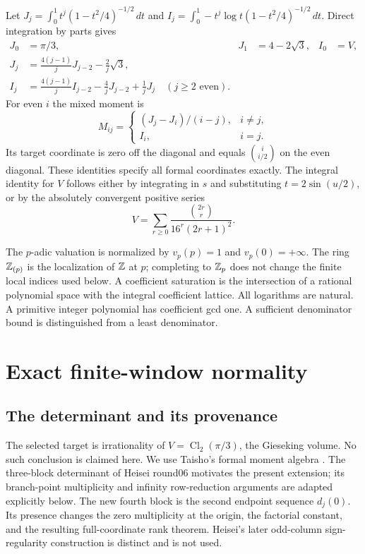 \documentclass[11pt,a4paper]{article}
\numberwithin{equation}{section}
\theoremstyle{definition}\newtheorem{definition}[theorem]{Definition}
\theoremstyle{remark}\newtheorem{remark}[theorem]{Remark}
\begin{document}
Let $J_j=\int_0^1t^j(1-t^2/4)^{-1/2}\,dt$ and
$I_j=\int_0^1-t^j\log t(1-t^2/4)^{-1/2}\,dt$. Direct integration by parts
gives
\begin{align*}
 J_0&=\pi/3,& J_1&=4-2\sqrt3,& I_0&=V,\\
 J_j&=\frac{4(j-1)}jJ_{j-2}-\frac2j\sqrt3,\\
 I_j&=\frac{4(j-1)}jI_{j-2}-\frac4jJ_{j-2}+\frac1jJ_j
 \quad(j\ge2\text{ even}).
\end{align*}
For even $i$ the mixed moment is
\[
 M_{ij}=\begin{cases}(J_j-J_i)/(i-j),&i\ne j,\\I_i,&i=j.
 \end{cases}
\]
Its target coordinate is zero off the diagonal and equals
$\binom{i}{i/2}$ on the even diagonal. These identities specify all formal
coordinates exactly. The integral identity for $V$ follows either by
integrating in $s$ and substituting $t=2\sin(u/2)$, or by the absolutely
convergent positive series
\[
 V=\sum_{r\ge0}\frac{\binom{2r}{r}}{16^r(2r+1)^2}.
\]

The $p$-adic valuation is normalized by $v_p(p)=1$ and $v_p(0)=+\infty$.
The ring $\mathbb Z_{(p)}$ is the localization of $\mathbb Z$ at $p$; completing to
$\mathbb Z_p$ does not change the finite local indices used below. A coefficient
saturation is the intersection of a rational polynomial space with the
integral coefficient lattice. All logarithms are natural. A primitive
integer polynomial has coefficient gcd one. A sufficient denominator
bound is distinguished from a least denominator.



\section{Exact finite-window normality}
\subsection{The determinant and its provenance}
The selected target is irrationality of $V=\operatorname{Cl}_2(\pi/3)$, the Gieseking volume. No such conclusion is claimed here. We use Taisho's formal moment algebra \cite{T05}. The three-block determinant of Heisei round06 \cite{H06} motivates the present extension; its branch-point multiplicity and infinity row-reduction arguments are adapted explicitly below. The new fourth block is the second endpoint sequence $d_j(0)$. Its presence changes the zero multiplicity at the origin, the factorial constant, and the resulting full-coordinate rank theorem. Heisei's later odd-column sign-regularity construction \cite{H42} is distinct and is not used.
\end{document}
